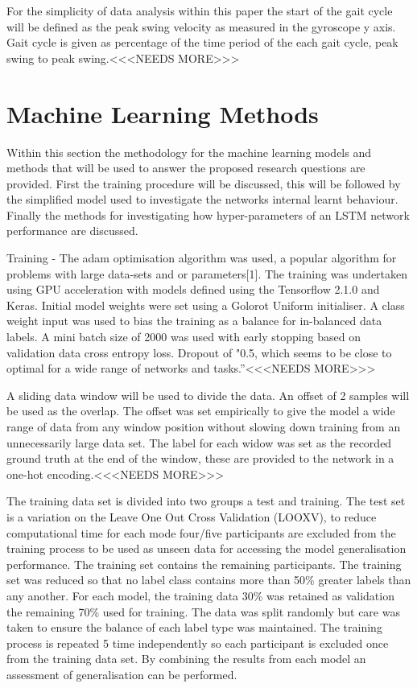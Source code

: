\documentclass[sensors,article,submit,moreauthors,pdftex]{Definitions/mdpi}
\begin{document}
For the simplicity of data analysis within this paper the start of the gait cycle will be defined as the peak swing velocity as measured in the gyroscope y axis. Gait cycle is given as percentage of the time period of the each gait cycle, peak swing to peak swing.<<<NEEDS MORE>>>

\section{Machine Learning Methods}
Within this section the methodology for the machine learning models and methods that will be used to answer the proposed research questions are provided. First the training procedure will be discussed, this will be followed by the simplified model used to investigate the networks internal learnt behaviour. Finally the methods for investigating how hyper-parameters of an LSTM network performance are discussed.

Training - The adam optimisation algorithm was used, a popular algorithm for problems with large data-sets and or parameters[1]. The training was undertaken using GPU acceleration with models defined using the Tensorflow 2.1.0 and Keras. Initial model weights were set using a Golorot Uniform initialiser. A class weight input was used to bias the training as a balance for in-balanced data labels. A mini batch size of 2000 was used with early stopping based on validation data cross entropy loss. Dropout of "0.5, which seems to be close to optimal for a wide range of networks and tasks.”\cite{Srivastava2014}<<<NEEDS MORE>>>

A sliding data window will be used to divide the data. An offset of 2 samples will be used as the overlap. The offset was set empirically to give the model a wide range of data from any window position without slowing down training from an unnecessarily large data set. The label for each widow was set as the recorded ground truth at the end of the window, these are provided to the network in a one-hot encoding.<<<NEEDS MORE>>>

The training data set is divided into two groups a test and training. The test set is a variation on the Leave One Out Cross Validation (LOOXV), to reduce computational time for each mode four/five participants are excluded from the training process to be used as unseen data for accessing the model generalisation performance. The training set contains the remaining participants. The training set was reduced so that no label class contains more than 50\% greater labels than any another. For each model, the training data 30\% was retained as validation the remaining 70\% used for training. The data was split randomly but care was taken to ensure the balance of each label type was maintained. The training process is repeated 5 time independently so each participant is excluded once from the training data set. By combining the results from each model an assessment of generalisation can be performed.
\end{document}
